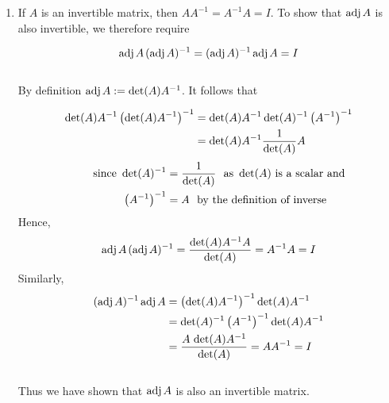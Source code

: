 \documentclass[12pt]{amsart}
\begin{document}
\begin{enumerate}
\begin{enumerate}
		\end{enumerate} 
		
	\item If $A$ is an invertible matrix, then $AA^{-1}=A^{-1}A=I$. To show that 
	$\text{adj}\hspace{0.05cm}A$ is also invertible, we therefore require
		
	$$\text{adj}\hspace{0.05cm}A \hspace{0.05cm} (\text{adj}\hspace{0.05cm}A)^{-1}=(\text{adj}
	\hspace{0.05cm}A)^{-1} \hspace{0.05cm} \text{adj}\hspace{0.05cm}A=I$$
	\\
	By definition $\text{adj} \hspace{0.05cm}A := \det (A)A^{-1}$.  It follows that 
	
		\begin{align}
			\det (A)A^{-1}\left(\det (A)A^{-1}\right)^{-1}&=\det (A)A^{-1} \det (A)^{-1}\left(A^{-1} \right)^{-1} 				\notag \\
			&=\det (A)A^{-1} \frac{1}{\det(A)}A \notag
		\end{align}
		\begin{align}
			\hspace{0.7cm} \text{since } \det(A)^{-1}&=\frac{1}{\det(A)} \text{ } \text{ as } \det(A) 
			\text{ is a scalar and} \notag \\
			\left(A^{-1}\right)^{-1}&=A \text{ } \text{ by the definition of inverse} \notag
		\end{align}
	Hence,
		\begin{align}
			\text{adj}\hspace{0.05cm}A \hspace{0.05cm} (\text{adj}\hspace{0.05cm}A)^{-1}=
			\frac{\det(A)A^{-1}A}{\det(A)} =A^{-1}A=I \notag
		\end{align}
	Similarly,
		\begin{align}
			(\text{adj} \hspace{0.05cm}A)^{-1} \hspace{0.05cm} \text{adj}\hspace{0.05cm}A&= \left(\det (A)			A^{-1}\right)^{-1} \det (A)A^{-1} \notag \\
			&=\det (A)^{-1}\left(A^{-1} \right)^{-1} \det (A)A^{-1} \notag \\
			&=\frac{A \hspace{0.05cm} \det (A)A^{-1}}{\det(A)}=AA^{-1}=I \notag
		\end{align}
	\\
	Thus we have shown that $\text{adj} \hspace{0.05cm}A$ is also an invertible matrix.
		
		\end{enumerate}
\end{document}
